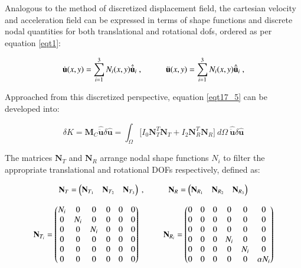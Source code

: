 Analogous to the method of discretized displacement field, the cartesian velocity and acceleration field can be expressed in terms of shape functions and discrete nodal quantities for both translational and rotational dofs, ordered as per equation \ref{eqt1}:

\begin{equation} 
\dot{\mathbf{u}} (x,y)
=
\sum_{i=1}^{3} N_i (x,y)
\hat{\dot{\mathbf{u}}}_i\ ,
\hspace{10mm}
\ddot{\mathbf{u}} (x,y)
=
\sum_{i=1}^{3} N_i (x,y)
\hat{\ddot{\mathbf{u}}}_i\ ,
\label{eqt17_6}
\end{equation}

Approached from this discretized perspective, equation \ref{eqt17_5} can be developed into:

\begin{equation} 
\delta K = \mathbf{M}_C \hat{\ddot{\mathbf{{u}}}} \delta \hat{\mathbf{u}}
=
\int_{\Omega} 
\Big[I_0
\mathbf{N}_T^T
\mathbf{N}_T
+
I_2
\mathbf{N}_R^T
\mathbf{N}_R
\Big]
\ d\Omega\ 
\hat{\ddot{\mathbf{{u}}}}
\delta \hat{\mathbf{u}}
\label{eqt17_7}
\end{equation}

The matrices $\mathbf{N}_T$ and $\mathbf{N}_R$ arrange nodal shape functions $N_i$ to filter the appropriate translational and rotational DOFs respectively, defined as:

\begin{equation} 
\mathbf{N}_T = 
\begin{pmatrix}
\mathbf{N}_{T_1} & \mathbf{N}_{T_2} & \mathbf{N}_{T_3}
\end{pmatrix}\ ,
\hspace{10mm}
\mathbf{N}_R = 
\begin{pmatrix}
\mathbf{N}_{R_1} & \mathbf{N}_{R_2} & \mathbf{N}_{R_3}
\end{pmatrix}
\label{eqt17_8}
\end{equation}

\begin{equation} 
\mathbf{N}_{T_i} = 
\begin{pmatrix}
N_i & 0 & 0 & 0 & 0 & 0 \\
0 & N_i & 0 & 0 & 0 & 0 \\
0 & 0 & N_i & 0 & 0 & 0 \\
0 & 0 & 0 & 0 & 0 & 0 \\
0 & 0 & 0 & 0 & 0 & 0 \\
0 & 0 & 0 & 0 & 0 & 0
\end{pmatrix}
\hspace{10mm}
\mathbf{N}_{R_i} = 
\begin{pmatrix}
0 & 0 & 0 & 0 & 0 & 0 \\
0 & 0 & 0 & 0 & 0 & 0 \\
0 & 0 & 0 & 0 & 0 & 0 \\
0 & 0 & 0 & N_i & 0 & 0 \\
0 & 0 & 0 & 0 & N_i & 0 \\
0 & 0 & 0 & 0 & 0 & \alpha N_i
\end{pmatrix}
\label{eqt17_9}
\end{equation}

